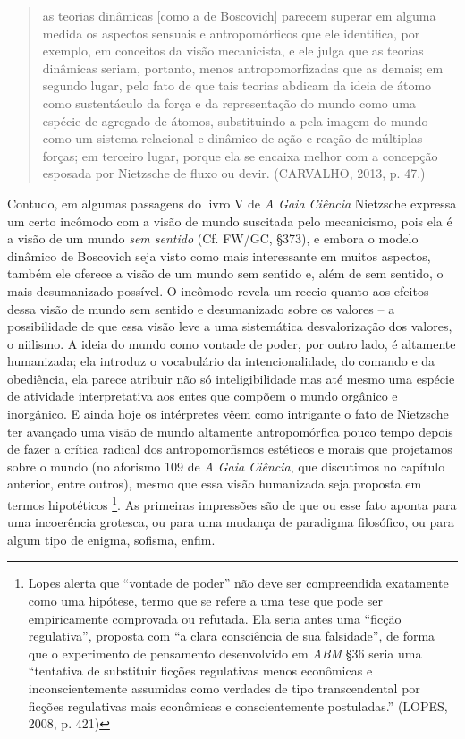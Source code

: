 \documentclass[
	12pt,				%
	openright,			%
	oneside,			%
	a4paper,			%
	english,			%
	french,				%
	spanish,			%
	brazil				%
	]{abntex2}
\begin{document}
\begin{quotation}
as teorias dinâmicas [como a de Boscovich] parecem superar em alguma medida os aspectos sensuais e antropomórficos que ele identifica, por exemplo, em conceitos da visão mecanicista, e ele julga que as teorias dinâmicas seriam, portanto, menos antropomorfizadas que as demais; em segundo lugar, pelo fato de que tais teorias abdicam da ideia de átomo como sustentáculo da força e da representação do mundo como uma espécie de agregado de átomos, substituindo-a pela imagem do mundo como um sistema relacional e dinâmico de ação e reação de múltiplas forças; em terceiro lugar, porque ela se encaixa melhor com a concepção esposada por Nietzsche de fluxo ou devir. (CARVALHO, 2013, p. 47.)
\end{quotation}

Contudo, em algumas passagens do livro V de \textit{A Gaia Ciência} Nietzsche expressa um certo incômodo com a visão de mundo suscitada pelo mecanicismo, pois ela é a visão de um mundo \textit{sem sentido} (Cf. FW/GC, §373), e embora o modelo dinâmico de Boscovich seja visto como mais interessante em muitos aspectos, também ele oferece a visão de um mundo sem sentido e, além de sem sentido, o mais desumanizado possível. O incômodo revela um receio quanto aos efeitos dessa visão de mundo sem sentido e desumanizado sobre os valores – a possibilidade de que essa visão leve a uma sistemática desvalorização dos valores, o niilismo. A ideia do mundo como vontade de poder, por outro lado, é altamente humanizada; ela introduz o vocabulário da intencionalidade, do comando e da obediência, ela parece atribuir não só inteligibilidade mas até mesmo uma espécie de atividade interpretativa aos entes que compõem o mundo orgânico e inorgânico. E ainda hoje os intérpretes vêem como intrigante o fato de Nietzsche ter avançado uma visão de mundo altamente antropomórfica pouco tempo depois de fazer a crítica radical dos antropomorfismos estéticos e morais que projetamos sobre o mundo (no aforismo 109 de \textit{A Gaia Ciência}, que discutimos no capítulo anterior, entre outros), mesmo que essa visão humanizada seja proposta em termos hipotéticos
\footnote{Lopes alerta que “vontade de poder” não deve ser compreendida exatamente como uma hipótese, termo que se refere a uma tese que pode ser empiricamente comprovada ou refutada. Ela seria antes uma “ficção regulativa”, proposta com “a clara consciência de sua falsidade”, de forma que o experimento de pensamento desenvolvido em \textit{ABM} §36 seria uma “tentativa de substituir ficções regulativas menos econômicas e inconscientemente assumidas como verdades de tipo transcendental por ficções regulativas mais econômicas e conscientemente postuladas.” (LOPES, 2008, p. 421)}. 
As primeiras impressões são de que ou esse fato aponta para uma incoerência grotesca, ou para uma mudança de paradigma filosófico, ou para algum tipo de enigma, sofisma, enfim.
\end{document}
